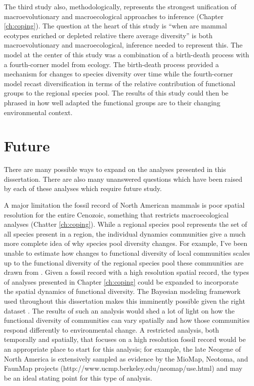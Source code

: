 The third study also, methodologically, represents the strongest unification of macroevolutionary and macroecological approaches to inference (Chapter \ref{ch:coping}). The question at the heart of this study is ``when are mammal ecotypes enriched or depleted relative there average diversity'' is both macroevolutionary and macroecological, inference needed to represent this. The model at the center of this study was a combination of a birth-death process with a fourth-corner model from ecology. The birth-death process provided a mechanism for changes to species diversity over time while the fourth-corner model recast diversification in terms of the relative contribution of functional groups to the regional species pool. The results of this study could then be phrased in how well adapted the functional groups are to their changing environmental context.



\section{Future}

There are many possible ways to expand on the analyses presented in this dissertation. There are also many unanswered questions which have been raised by each of these analyses which require future study.

A major limitation the fossil record of North American mammals is poor spatial resolution for the entire Cenozoic, something that restricts macroecological analyses (Chatter \ref{ch:coping}). While a regional species pool represents the set of all species present in a region, the individual dynamics communities give a much more complete idea of why species pool diversity changes. For example, I've been unable to estimate how changes to functional diversity of local communities scales up to the functional diversity of the regional species pool these communities are drawn from \citep{Harrison2008}. Given a fossil record with a high resolution spatial record, the types of analyses presented in Chapter \ref{ch:coping} could be expanded to incorporate the spatial dynamics of functional diversity. The Bayesian modeling framework used throughout this dissertation makes this imminently possible given the right dataset \citep{Banerjee2004}. The results of such an analysis would shed a lot of light on how the functional diversity of communities can vary spatially and how those communities respond differently to environmental change. A restricted analysis, both temporally and spatially, that focuses on a high resolution fossil record would be an appropriate place to start for this analysis; for example, the late Neogene of North America is extensively sampled as evidence by the MioMap, Neotoma, and FaunMap projects (http://www.ucmp.berkeley.edu/neomap/use.html) and may be an ideal stating point for this type of analysis.

